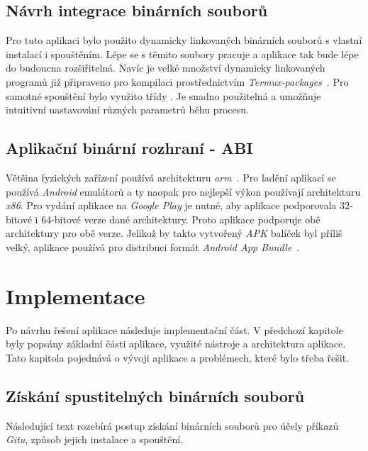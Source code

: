\section{Návrh integrace binárních souborů}
Pro tuto aplikaci bylo použito dynamicky linkovaných binárních souborů s vlastní instalací i spouštěním. Lépe se s těmito soubory pracuje a aplikace tak bude lépe do budoucna rozšiřitelná. Navíc je velké množství dynamicky linkovaných programů již připraveno pro kompilaci prostřednictvím \emph{Termux-packages}~. Pro samotné spouštění bylo využito třídy . Je snadno použitelná a umožňuje intuitivní nastavování různých parametrů běhu procesu.

\section{Aplikační binární rozhraní - ABI}
Většina fyzických zařízení používá architekturu \emph{arm}~. Pro ladění aplikací se používá \emph{Android} emulátorů a ty naopak pro nejlepší výkon používají architekturu \emph{x86}. Pro vydání aplikace na \emph{Google Play} je nutné, aby aplikace podporovala 32-bitové i 64-bitové verze dané architektury. Proto aplikace podporuje obě architektury pro obě verze. Jelikož by takto vytvořený \emph{APK} balíček byl příliš velký, aplikace používá pro distribuci formát \emph{Android App Bundle}~.
    
\chapter{Implementace}
Po návrhu řešení aplikace následuje implementační část. V předchozí kapitole byly popsány základní části aplikace, využité nástroje a architektura aplikace. Tato kapitola pojednává o vývoji aplikace a problémech, které bylo třeba řešit.

\section{Získání spustitelných binárních souborů}
Následující text rozebírá postup získání binárních souborů pro účely příkazů \emph{Gitu}, způsob jejich instalace a spouštění.

